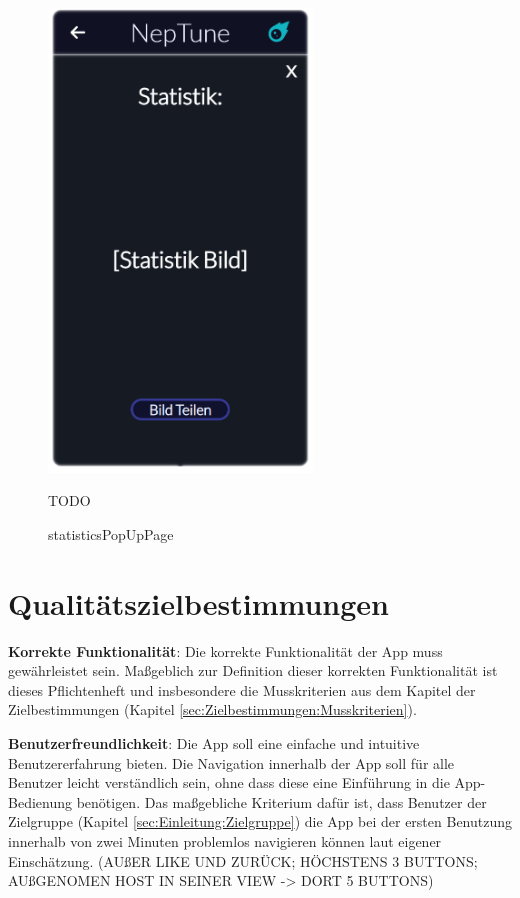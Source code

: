 \documentclass[oneside, ngerman]{sdqtechreport}
\begin{document}
\begin{figure}
    \hypertarget{statisticsPopUpPage}{}
    \begin{minipage}[t]{7 cm}
        \vspace{-1.5ex}
        \includegraphics[width=7cm]{LATEX/Pflichtenheft/GraphicDesigns/statisticsPopUpPage.png}
        \caption{statisticsPopUpPage}
    \end{minipage}
    \hspace{1cm}
    \begin{minipage}[t]{7 cm}
        \vspace{1cm}
        TODO
    \end{minipage}
\end{figure}

\chapter{Qualitätszielbestimmungen}
\label{chap:Qualitätszielbestimmungen}

\textbf{Korrekte Funktionalität}: Die korrekte Funktionalität der App muss gewährleistet sein. Maßgeblich zur Definition dieser korrekten Funktionalität ist dieses Pflichtenheft und insbesondere die Musskriterien aus dem Kapitel der Zielbestimmungen (Kapitel \ref{sec:Zielbestimmungen:Musskriterien}).

\textbf{Benutzerfreundlichkeit}: Die App soll eine einfache und intuitive Benutzererfahrung bieten. Die Navigation innerhalb der App soll für alle Benutzer leicht verständlich sein, ohne dass diese eine Einführung in die App-Bedienung benötigen. Das maßgebliche Kriterium dafür ist, dass Benutzer der Zielgruppe (Kapitel \ref{sec:Einleitung:Zielgruppe}) die App bei der ersten Benutzung innerhalb von zwei Minuten problemlos navigieren können laut eigener Einschätzung. (AUßER LIKE UND ZURÜCK; HÖCHSTENS 3 BUTTONS; AUßGENOMEN HOST IN SEINER VIEW -> DORT 5 BUTTONS)
\end{document}
